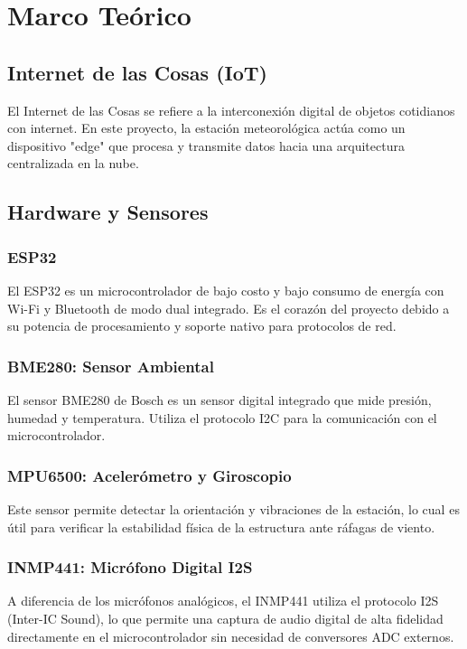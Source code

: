 \chapter{Marco Teórico}

\section{Internet de las Cosas (IoT)}
El Internet de las Cosas se refiere a la interconexión digital de objetos cotidianos con internet. En este proyecto, la estación meteorológica actúa como un dispositivo "edge" que procesa y transmite datos hacia una arquitectura centralizada en la nube.

\section{Hardware y Sensores}

\subsection{ESP32}
El ESP32 es un microcontrolador de bajo costo y bajo consumo de energía con Wi-Fi y Bluetooth de modo dual integrado. Es el corazón del proyecto debido a su potencia de procesamiento y soporte nativo para protocolos de red.

\subsection{BME280: Sensor Ambiental}
El sensor BME280 de Bosch es un sensor digital integrado que mide presión, humedad y temperatura. Utiliza el protocolo I2C para la comunicación con el microcontrolador.

\subsection{MPU6500: Acelerómetro y Giroscopio}
Este sensor permite detectar la orientación y vibraciones de la estación, lo cual es útil para verificar la estabilidad física de la estructura ante ráfagas de viento.

\subsection{INMP441: Micrófono Digital I2S}
A diferencia de los micrófonos analógicos, el INMP441 utiliza el protocolo I2S (Inter-IC Sound), lo que permite una captura de audio digital de alta fidelidad directamente en el microcontrolador sin necesidad de conversores ADC externos.

